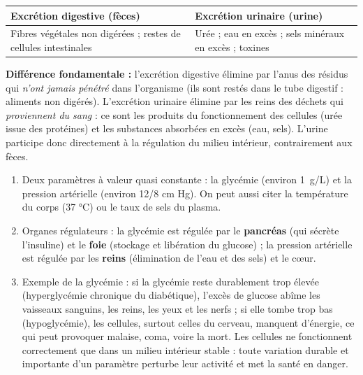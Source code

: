 \documentclass[11pt]{article}
\newcommand{\cle}[1]{{\popxbold\color{popdark}#1}}
\begin{document}
\begin{corrige}
\begin{center}
\begin{tabularx}{\linewidth}{|X|X|}
\hline
\rowcolor{popblueL} \textbf{Excrétion digestive (fèces)} & \textbf{Excrétion urinaire (urine)} \\
\hline
Fibres végétales non digérées ; restes de cellules intestinales & Urée ; eau en excès ; sels minéraux en excès ; toxines \\
\hline
\end{tabularx}
\end{center}
\textbf{Différence fondamentale :} l'excrétion digestive élimine par l'anus des résidus qui \emph{n'ont jamais pénétré} dans l'organisme (ils sont restés dans le tube digestif : aliments non digérés). L'excrétion urinaire élimine par les reins des déchets qui \emph{proviennent du sang} : ce sont les produits du fonctionnement des cellules (urée issue des protéines) et les substances absorbées en excès (eau, sels). L'urine participe donc directement à la régulation du milieu intérieur, contrairement aux fèces.
\end{corrige}

\begin{corrige}
\begin{enumerate}
\item Deux paramètres à valeur quasi constante : la \cle{glycémie} (environ \SI{1}{g/L}) et la \cle{pression artérielle} (environ 12/8 cm Hg). On peut aussi citer la température du corps (37 °C) ou le taux de sels du plasma.
\item Organes régulateurs : la glycémie est régulée par le \textbf{pancréas} (qui sécrète l'insuline) et le \textbf{foie} (stockage et libération du glucose) ; la pression artérielle est régulée par les \textbf{reins} (élimination de l'eau et des sels) et le c\oe ur.
\item Exemple de la glycémie : si la glycémie reste durablement trop élevée (hyperglycémie chronique du diabétique), l'excès de glucose abîme les vaisseaux sanguins, les reins, les yeux et les nerfs ; si elle tombe trop bas (hypoglycémie), les cellules, surtout celles du cerveau, manquent d'énergie, ce qui peut provoquer malaise, coma, voire la mort. Les cellules ne fonctionnent correctement que dans un milieu intérieur stable : toute variation durable et importante d'un paramètre perturbe leur activité et met la santé en danger.
\end{enumerate}
\end{corrige}
\end{document}
